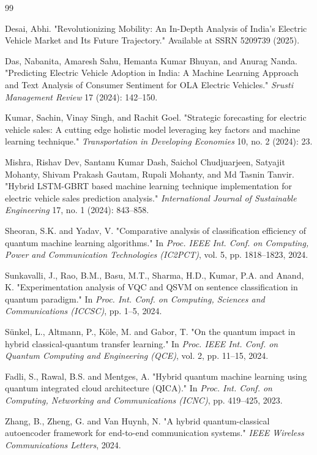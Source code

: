 \documentclass[pdflatex,sn-mathphys-num]{sn-jnl}%
\begin{document}
\begin{thebibliography}{99}

Desai, Abhi. "Revolutionizing Mobility: An In-Depth Analysis of India's Electric Vehicle Market and Its Future Trajectory." Available at SSRN 5209739 (2025).

Das, Nabanita, Amaresh Sahu, Hemanta Kumar Bhuyan, and Anurag Nanda.
"Predicting Electric Vehicle Adoption in India: A Machine Learning Approach and Text Analysis of Consumer Sentiment for OLA Electric Vehicles."
\textit{Srusti Management Review} 17 (2024): 142--150.

Kumar, Sachin, Vinay Singh, and Rachit Goel.
"Strategic forecasting for electric vehicle sales: A cutting edge holistic model leveraging key factors and machine learning technique."
\textit{Transportation in Developing Economies} 10, no. 2 (2024): 23.

Mishra, Rishav Dev, Santanu Kumar Dash, Saichol Chudjuarjeen, Satyajit Mohanty, Shivam Prakash Gautam, Rupali Mohanty, and Md Tasnin Tanvir.
"Hybrid LSTM-GBRT based machine learning technique implementation for electric vehicle sales prediction analysis."
\textit{International Journal of Sustainable Engineering} 17, no. 1 (2024): 843--858.

Sheoran, S.K. and Yadav, V.
"Comparative analysis of classification efficiency of quantum machine learning algorithms."
In \textit{Proc. IEEE Int. Conf. on Computing, Power and Communication Technologies (IC2PCT)}, vol. 5, pp. 1818–1823, 2024.

Sunkavalli, J., Rao, B.M., Basu, M.T., Sharma, H.D., Kumar, P.A. and Anand, K.
"Experimentation analysis of VQC and QSVM on sentence classification in quantum paradigm."
In \textit{Proc. Int. Conf. on Computing, Sciences and Communications (ICCSC)}, pp. 1–5, 2024.

Sünkel, L., Altmann, P., Köle, M. and Gabor, T.
"On the quantum impact in hybrid classical-quantum transfer learning."
In \textit{Proc. IEEE Int. Conf. on Quantum Computing and Engineering (QCE)}, vol. 2, pp. 11–15, 2024.

Fadli, S., Rawal, B.S. and Mentges, A.
"Hybrid quantum machine learning using quantum integrated cloud architecture (QICA)."
In \textit{Proc. Int. Conf. on Computing, Networking and Communications (ICNC)}, pp. 419–425, 2023.

Zhang, B., Zheng, G. and Van Huynh, N.
"A hybrid quantum-classical autoencoder framework for end-to-end communication systems."
\textit{IEEE Wireless Communications Letters}, 2024.


\end{thebibliography}
\end{document}
